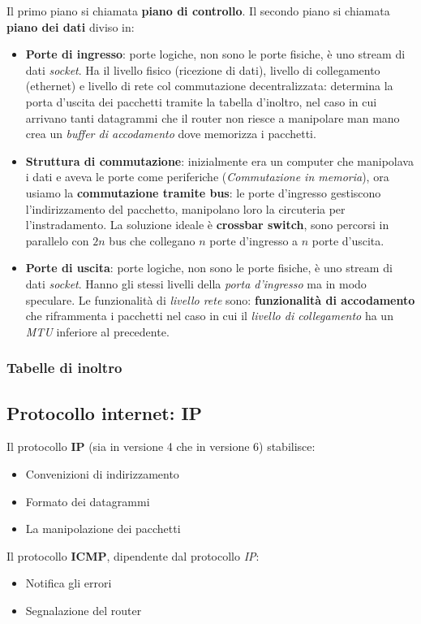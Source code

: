 Il primo piano si chiamata \textbf{piano di controllo}. 
Il secondo piano si chiamata \textbf{piano dei dati} diviso in:
\begin{itemize}
  \item \textbf{Porte di ingresso}: porte logiche, non sono le porte fisiche, è uno stream di dati \textit{socket}. 
    Ha il livello fisico (ricezione di dati), livello di collegamento (ethernet) e livello di rete col commutazione decentralizzata: determina la porta d'uscita dei pacchetti tramite la tabella d'inoltro, nel caso in cui arrivano tanti datagrammi che il router non riesce a manipolare man mano crea un \textit{buffer di accodamento} dove memorizza i pacchetti. 
  \item \textbf{Struttura di commutazione}: inizialmente era un computer che manipolava i dati e aveva le porte come periferiche (\textit{Commutazione in memoria}), ora usiamo la \textbf{commutazione tramite bus}:
    le porte d'ingresso gestiscono l'indirizzamento del pacchetto, manipolano loro la circuteria per l'instradamento. 
    La soluzione ideale è \textbf{crossbar switch}, sono percorsi in parallelo con $2n$ bus che collegano $n$ porte d'ingresso a $n$ porte d'uscita. 
  \item \textbf{Porte di uscita}: porte logiche, non sono le porte fisiche, è uno stream di dati \textit{socket}. Hanno gli stessi livelli della \textit{porta d'ingresso} ma in modo speculare. 
    Le funzionalità di \textit{livello rete} sono: \textbf{funzionalità di accodamento} che riframmenta i pacchetti nel caso in cui il \textit{livello di collegamento} ha un \textit{MTU} inferiore al precedente. 
\end{itemize}

\subsubsection{Tabelle di inoltro}


\subsection{Protocollo internet: IP}
Il protocollo \textbf{IP} (sia in versione 4 che in versione 6) stabilisce:
\begin{itemize}
  \item Convenizioni di indirizzamento
  \item Formato dei datagrammi 
  \item La manipolazione dei pacchetti
\end{itemize}
Il protocollo \textbf{ICMP}, dipendente dal protocollo \textit{IP}:
\begin{itemize}
  \item Notifica gli errori
  \item Segnalazione del router
\end{itemize}

